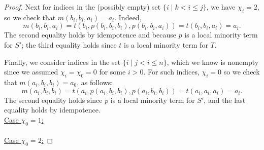 \begin{proof}
  Next for indices in the (possibly empty) set $\{i \mid k< i \leq j\}$, we have
  $\chi_i = 2$, so we check that $m(b_i, b_i, a_i) = a_i$.  Indeed,
  \[
  m(b_i,b_i,a_i) = t(b_i, p(b_i, b_i, b_i), p(b_i, b_i, a_i)) = t(b_i, b_i, a_i)
  = a_i.
  \]
  The second equality holds by idempotence and because $p$ is a
  local minority term for $S'$; the third equality holds since $t$ is a local minority
  term for $T$.

  Finally, we consider indices in the set $\{i \mid j< i \leq n\}$, which we know is
  nonempty since we assumed $\chi_i = \chi_0 = 0$ for some $i>0$.
  For such indices, $\chi_i=0$ so we check that
  $m(a_i,b_i,b_i)= a_0$, as follows:
  \[
  m(a_i,b_i,b_i) = t(a_i, p(a_i, b_i, b_i), p(a_i, b_i, b_i)) =
   t(a_i, a_i, a_i) =a_i.
  \]
  The second equality holds since $p$ is a local minority term for $S'$,
  and the last equality holds by idempotence.
  \\
  \underline{Case $\chi_0 = 1$:}\\
  \\
  \underline{Case $\chi_0 = 2$:} 
  
  
\end{proof}













































\appendix


